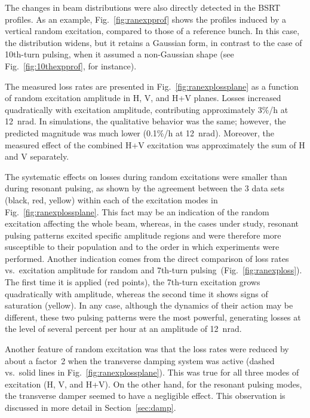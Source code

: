 \documentclass[%
 reprint,
 amsmath,amssymb,
 aps,
prstab,
longbibliography
]{revtex4-1}
\newcommand{\seventhtp}{7th-turn pulsing}
\newcommand{\tenthtp}{10th-turn pulsing}
\begin{document}
The changes in beam distributions were also directly detected in the
BSRT profiles. As an example, Fig.~\ref{fig:ranexpprof} shows the
profiles induced by a vertical random excitation, compared to those of
a reference bunch. In this case, the distribution widens, but it
retains a Gaussian form, in contrast to the case of \tenthtp, when it
assumed a non-Gaussian shape (see Fig.~\ref{fig:10thexpprof}, for
instance).

The measured loss rates are presented in
Fig.~\ref{fig:ranexplossplane} as a function of random excitation
amplitude in H, V, and H+V planes.  Losses increased quadratically
with excitation amplitude, contributing approximately 3\%/h at
12~nrad. In simulations, the qualitative behavior was the same;
however, the predicted magnitude was much lower (0.1\%/h at
12~nrad). Moreover, the measured effect of the combined H+V excitation
was approximately the sum of H and V separately.

The systematic effects on losses during random excitations were
smaller than during resonant pulsing, as shown by the agreement
between the 3 data sets (black, red, yellow) within each of the
excitation modes in Fig.~\ref{fig:ranexplossplane}. This fact may be
an indication of the random excitation affecting the whole beam,
whereas, in the cases under study, resonant pulsing patterns excited
specific amplitude regions and were therefore more susceptible to
their population and to the order in which experiments were
performed. Another indication comes from the direct comparison of loss
rates vs.\ excitation amplitude for random and \seventhtp\
(Fig.~\ref{fig:ranexploss}). The first time it is applied (red
points), the 7th-turn excitation grows quadratically with amplitude,
whereas the second time it shows signs of saturation (yellow). In any
case, although the dynamics of their action may be different, these
two pulsing patterns were the most powerful, generating losses at the
level of several percent per hour at an amplitude of 12~nrad.

Another feature of random excitation was that the loss rates were
reduced by about a factor~2 when the transverse damping system was
active (dashed vs.\ solid lines in
Fig.~\ref{fig:ranexplossplane}). This was true for all three modes of
excitation (H, V, and H+V). On the other hand, for the resonant
pulsing modes, the transverse damper seemed to have a negligible
effect. This observation is discussed in more detail in
Section~\ref{sec:damp}.
\end{document}
